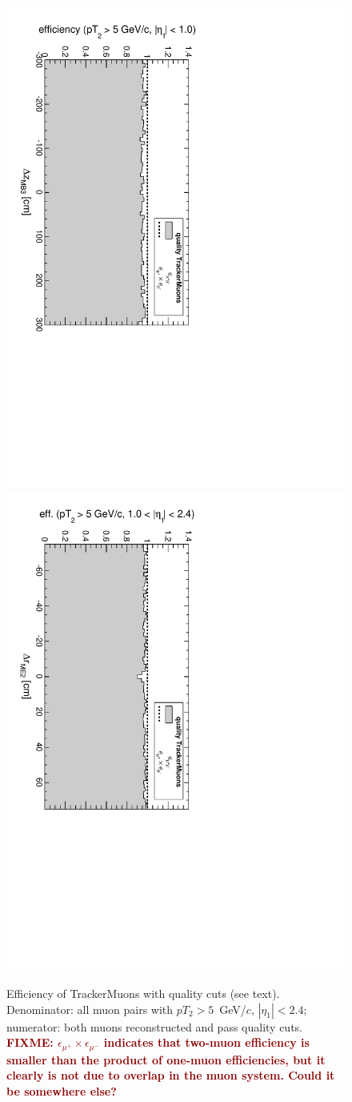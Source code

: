 \documentclass[12pt]{article}
\newcommand{\fixme}[1]{\textcolor{darkred}{\bf FIXME: #1}}
\begin{document}
\begin{figure}
\includegraphics[height=0.5\linewidth, angle=90]{fig/acceptance8_plot/vsmb3dz_PlainTrackerMuon.pdf}
\includegraphics[height=0.5\linewidth, angle=90]{fig/acceptance8_plot/vsme2dr_PlainTrackerMuon.pdf}

\caption{Efficiency of TrackerMuons with quality cuts (see text).  Denominator: all muon pairs with $pT_2 > 5$~GeV/$c$, $|\eta_1| < 2.4$; numerator: both muons reconstructed and pass quality cuts. \fixme{$\epsilon_{\mu^+} \times \epsilon_{\mu^-}$ indicates that two-muon efficiency is smaller than the product of one-muon efficiencies, but it clearly is not due to overlap in the muon system.  Could it be somewhere else?} \label{fig:efficiencies_PlainTrackerMuon}}
\end{figure}
\end{document}
